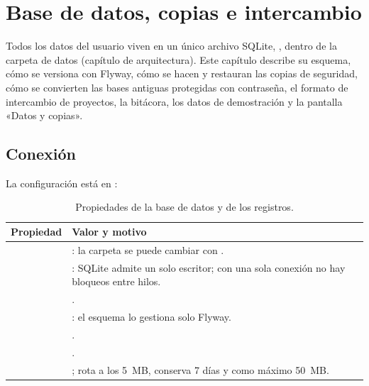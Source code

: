 \section{Base de datos, copias e intercambio}
\label{sec:bd-base}

Todos los datos del usuario viven en un único archivo SQLite, , dentro de la carpeta de datos
(capítulo de arquitectura). Este capítulo describe su esquema, cómo se versiona con Flyway, cómo se hacen y restauran
las copias de seguridad, cómo se convierten las bases antiguas protegidas con contraseña, el formato de intercambio de
proyectos, la bitácora, los datos de demostración y la pantalla «Datos y copias».

\subsection{Conexión}

La configuración está en :

\begin{table}[H]
	\centering
	\caption{Propiedades de la base de datos y de los registros.}
	\label{tab:bd-propiedades}
	\begin{tabular}{L{7.0cm}L{7.8cm}}
		\hline
		\textbf{Propiedad} & \textbf{Valor y motivo} \\ \hline
		 & :
		la carpeta se puede cambiar con . \\
		 & : SQLite admite un solo escritor; con una sola
		conexión no hay bloqueos entre hilos. \\
		 & . \\
		 & : el esquema lo gestiona solo Flyway. \\
		 & . \\
		 & . \\
		 & ; rota a los 5~MB, conserva 7 días y como
		máximo 50~MB. \\ \hline
	\end{tabular}
\end{table}

